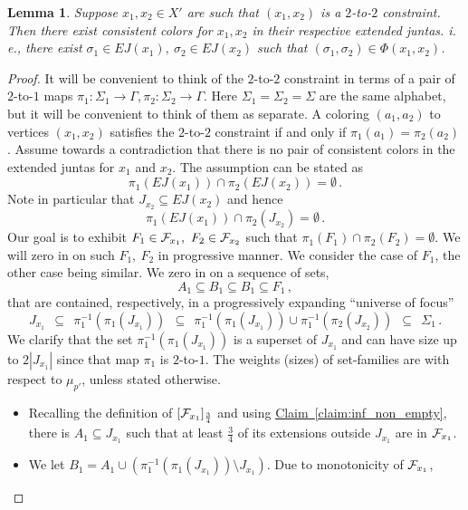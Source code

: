 \documentclass[11pt]{article}
\numberwithin{equation}{section}
\newtheorem{lemma}[theorem]{Lemma}
\theoremstyle{definition}
\theoremstyle{plain}
\newcommand{\ie}{i.\,e.}
\newcommand{\expref}[2]{\hyperref[#2]{#1~\ref{#2}}}
\begin{document}
\begin{lemma}\label{lemma:there_is_constraint}
Suppose $x_1,x_2\in X'$ are such that $(x_1,x_2)$ is a $2$-to-$2$ constraint.
Then there exist consistent colors
for $x_1,x_2$ in their respective  %
extended juntas. \ie, there exist $\sigma_1  \in EJ(x_1), ~\sigma_2 \in EJ(x_2)$
such that $(\sigma_1, \sigma_2) \in \Phi(x_1, x_2)$.
\end{lemma}
\begin{proof}
It will be
convenient to think of the $2$-to-$2$ constraint in terms of a pair of $2$-to-$1$ maps
$\pi_1: \Sigma_1 \to \Gamma, \pi_2: \Sigma_2 \to \Gamma$. Here $\Sigma_1 = \Sigma_2 = \Sigma$ are
the same alphabet, but it will be convenient to think of them as separate.
A coloring $(a_1, a_2)$ to vertices $(x_1, x_2)$ satisfies the
$2$-to-$2$ constraint if and only if $\pi_1(a_1) = \pi_2(a_2)$. Assume towards a contradiction that
there is no pair of consistent colors in the extended juntas for $x_1$ and $x_2$.
The assumption can be stated as
 $$  \pi_1 ( EJ(x_1) ) \cap \pi_2 (EJ(x_2) ) = \emptyset\,. $$%
Note in particular that $J_{x_2} \subseteq EJ(x_2)$ and hence
\begin{equation} \label{eqn:assumption}
    \pi_1 ( EJ(x_1) ) \cap  \pi_2 ( J_{x_2} ) = \emptyset\,.%
\end{equation}
Our goal is to exhibit $F_1 \in {\cal F}_{x_1}, ~F_2 \in {\cal F}_{x_2}$ such that $\pi_1(F_1)
\cap \pi_2(F_2) = \emptyset$. We will zero in on such $F_1, ~F_2$ in progressive manner.
%
We consider the case of $F_1$, the other case being similar. We zero in on
a sequence of sets,  %
 $$ A_1  \subseteq B_1 \subseteq B_1  \subseteq  F_1\,, $$%
that are contained, respectively, %
in a %
progressively expanding ``universe of focus''
 $$ J_{x_1} \ \ \subseteq \ \  \pi_1^{-1} ( \pi_1( J_{x_1} ) )  \ \  \subseteq \  \
    \pi_1^{-1}( \pi_1 ( J_{x_1}  ) ) \cup  \pi_1^{-1} ( \pi_2  ( J_{x_2} ) )  \ \  \subseteq \ \ \Sigma_1\,.$$%
    We clarify that the set $ \pi_1^{-1} ( \pi_1( J_{x_1} ) ) $ is a superset of $J_{x_1}$
    and can have size up to $2 |J_{x_1}|$ since that map $\pi_1$ is $2$-to-$1$.
The weights (sizes) of set-families are with respect to $\mu_{p'}$, unless stated otherwise.
\begin{itemize}
\item Recalling the definition of $[{\cal F}_{x_1}]_{\frac{3}{4}}$ and using \expref{Claim}{claim:inf_non_empty},
    there is
      $A_1 \subseteq J_{x_1}$ such that at least $\frac{3}{4}$ of its extensions outside $J_{x_1}$
      are in ${\cal F}_{x_1}$.
\item We let $B_1 =  A_1  \cup \left(  \pi_1^{-1} ( \pi_1( J_{x_1} ) )  \setminus J_{x_1}  \right)$. Due to monotonicity of ${\cal F}_{x_1}$,

\end{itemize}
\end{proof}
\end{document}
